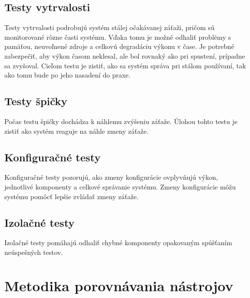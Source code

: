 \documentclass[12pt,oneside,final]{fithesis-utf8}
\begin{document}
\section{Testy vytrvalosti}
Testy vytrvalosti podrobujú systém stálej očakávanej záťaži, pričom sú monitorované rôzne časti systému. Vďaka tomu je možné odhaliť problémy s pamäťou, neuvoľnené zdroje a celkovú degradáciu výkonu v čase. Je potrebné zabezpečiť, aby výkon časom neklesal, ale bol rovnaký ako pri spustení, prípadne sa zvyšoval. Cieľom testu je zistiť, ako sa systém správa pri stálom používaní, tak ako tomu bude po jeho nasadení do praxe. 

\section{Testy špičky}
Počas testu špičky dochádza k náhlemu zvýšeniu záťaže. Úlohou tohto testu je zistiť ako systém reaguje na náhle zmeny záťaže.

\section{Konfiguračné testy}
Konfiguračné testy pozorujú, ako zmeny konfigurácie ovplyvňujú výkon, jednotlivé komponenty a celkové správanie systému. Zmeny konfigurácie môžu systému pomôcť lepšie zvládať zmeny záťaže.

\section{Izolačné testy}
Izolačné testy pomáhajú odhaliť chybné komponenty opakovaným spúšťaním neúspešných testov.


\chapter{Metodika porovnávania nástrojov}
\end{document}
